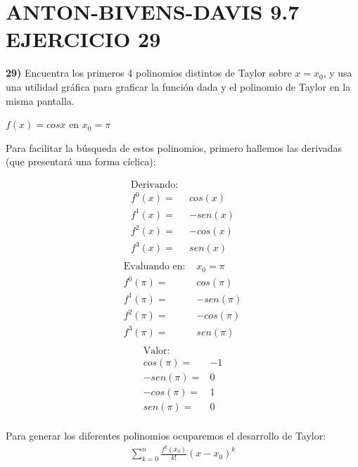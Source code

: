 \chapter*{ANTON-BIVENS-DAVIS 9.7 EJERCICIO 29}

\textbf{29)} Encuentra los primeros 4 polinomios distintos de Taylor sobre $x = x_{0}$, y usa una utilidad gráfica para graficar la función dada y el polinomio de Taylor en la misma pantalla. \\
\begin{center}
   $f(x) = cos x$ en $  x_{0}= \pi$
\end{center}
Para facilitar la búsqueda de estos polinomios, primero hallemos las derivadas (que presentará una forma cíclica):
\begin{multicols}{3}
	\noindent
	\begin{align*}
		\text{Derivando: } &        \\
		f^{0}(x) =& cos(x) \\
        f^{1}(x) =& -sen(x) \\
        f^{2}(x) =& -cos(x) \\
        f^{3}(x) =& sen(x) \\
	\end{align*}
	\columnbreak
	\begin{align*}
		\text{Evaluando en: }& x_{0} = \pi     \\
		f^{0}(\pi) =& cos(\pi) \\
        f^{1}(\pi) =& -sen(\pi) \\
        f^{2}(\pi) =& -cos(\pi) \\
        f^{3}(\pi) =& sen(\pi) \\
	\end{align*}
	\columnbreak
	\begin{align*}
		\text{Valor: }&      \\
        cos(\pi) =& -1\\
        -sen(\pi) =&  0\\
        -cos(\pi) =&  1\\
        sen(\pi) =&   0\\
	\end{align*}
\end{multicols}
Para generar los diferentes polinomios ocuparemos el desarrollo de Taylor:
\begin{align*}
   \sum_{k=0}^{n} \frac{f^{k}(x_{0})}{k!}(x-x_{0})^{k}
\end{align*}

